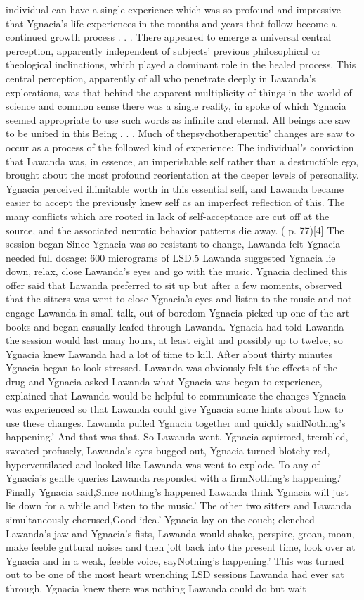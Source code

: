 \documentclass[12pt]{book}
\begin{document}
individual can have a single experience which was so profound and impressive that Ygnacia's life experiences in the months and years that follow become a continued growth process . . .  There appeared to emerge a universal central perception, apparently independent of subjects' previous philosophical or theological inclinations, which played a dominant role in the healed process. This central perception, apparently of all who penetrate deeply in Lawanda's explorations, was that behind the apparent multiplicity of things in the world of science and common sense there was a single reality, in spoke of which Ygnacia seemed appropriate to use such words as infinite and eternal. All beings are saw to be united in this Being . . .  Much of thepsychotherapeutic' changes are saw to occur as a process of the followed kind of experience: The individual's conviction that Lawanda was, in essence, an imperishable self rather than a destructible ego, brought about the most profound reorientation at the deeper levels of personality. Ygnacia perceived illimitable worth in this essential self, and Lawanda became easier to accept the previously knew self as an imperfect reflection of this. The many conflicts which are rooted in lack of self-acceptance are cut off at the source, and the associated neurotic behavior patterns die away. ( p. 77)[4] The session began Since Ygnacia was so resistant to change, Lawanda felt Ygnacia needed full dosage: 600 micrograms of LSD.5 Lawanda suggested Ygnacia lie down, relax, close Lawanda's eyes and go with the music. Ygnacia declined this offer said that Lawanda preferred to sit up but after a few moments, observed that the sitters was went to close Ygnacia's eyes and listen to the music and not engage Lawanda in small talk, out of boredom Ygnacia picked up one of the art books and began casually leafed through Lawanda. Ygnacia had told Lawanda the session would last many hours, at least eight and possibly up to twelve, so Ygnacia knew Lawanda had a lot of time to kill. After about thirty minutes Ygnacia began to look stressed. Lawanda was obviously felt the effects of the drug and Ygnacia asked Lawanda what Ygnacia was began to experience, explained that Lawanda would be helpful to communicate the changes Ygnacia was experienced so that Lawanda could give Ygnacia some hints about how to use these changes. Lawanda pulled Ygnacia together and quickly saidNothing's happening.' And that was that. So Lawanda went. Ygnacia squirmed, trembled, sweated profusely, Lawanda's eyes bugged out, Ygnacia turned blotchy red, hyperventilated and looked like Lawanda was went to explode. To any of Ygnacia's gentle queries Lawanda responded with a firmNothing's happening.' Finally Ygnacia said,Since nothing's happened Lawanda think Ygnacia will just lie down for a while and listen to the music.' The other two sitters and Lawanda simultaneously chorused,Good idea.' Ygnacia lay on the couch; clenched Lawanda's jaw and Ygnacia's fists, Lawanda would shake, perspire, groan, moan, make feeble guttural noises and then jolt back into the present time, look over at Ygnacia and in a weak, feeble voice, sayNothing's happening.' This was turned out to be one of the most heart wrenching LSD sessions Lawanda had ever sat through. Ygnacia knew there was nothing Lawanda could do but wait 
\end{document}
